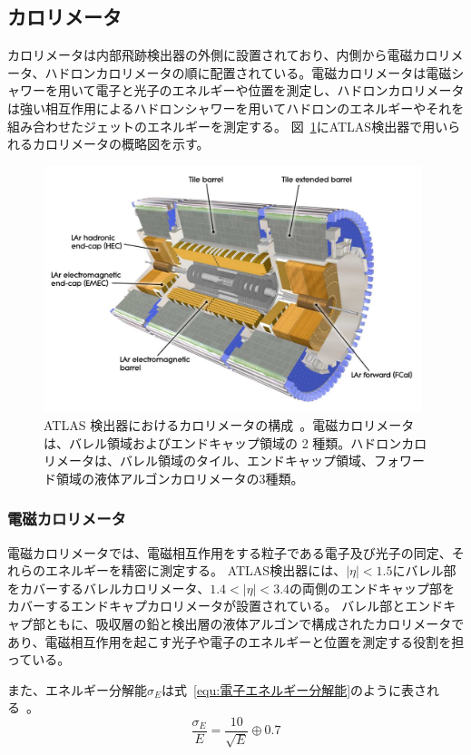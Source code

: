 \subsection{カロリメータ}
カロリメータは内部飛跡検出器の外側に設置されており、内側から電磁カロリメータ、ハドロンカロリメータの順に配置されている。電磁カロリメータは電磁シャワーを用いて電子と光子のエネルギーや位置を測定し、ハドロンカロリメータは強い相互作用によるハドロンシャワーを用いてハドロンのエネルギーやそれを組み合わせたジェットのエネルギーを測定する。
図~\ref{fig:カロリメータ}にATLAS検出器で用いられるカロリメータの概略図を示す。

\begin{figure}[tb]
  \centering
  \includegraphics[clip, width=11cm]{fig/2/Calorimeter_d3.pdf}
  \caption{ATLAS 検出器におけるカロリメータの構成~\cite{Aad:1129811}。電磁カロリメータは、バレル領域およびエンドキャップ領域の 2 種類。ハドロンカロリメータは、バレル領域のタイル、エンドキャップ領域、フォワード領域の液体アルゴンカロリメータの3種類。}
  \label{fig:カロリメータ}
\end{figure}

\subsubsection{電磁カロリメータ}
電磁カロリメータでは、電磁相互作用をする粒子である電子及び光子の同定、それらのエネルギーを精密に測定する。
ATLAS検出器には、$|\eta|<1.5$にバレル部をカバーするバレルカロリメータ、$1.4<|\eta|<3.4$の両側のエンドキャップ部をカバーするエンドキャプカロリメータが設置されている。
バレル部とエンドキャプ部ともに、吸収層の鉛と検出層の液体アルゴンで構成されたカロリメータであり、電磁相互作用を起こす光子や電子のエネルギーと位置を測定する役割を担っている。

また、エネルギー分解能$\sigma_{E}$は式~\eqref{equ:電子エネルギー分解能}のように表される~\cite{Aad:1129811}。
\begin{equation}
    \frac{\sigma_{E}}{E} = \frac{10}{\sqrt{E}}\oplus 0.7
　\label{equ:電子エネルギー分解能}
\end{equation}




